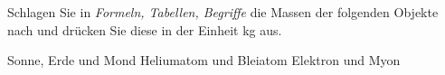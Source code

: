 Schlagen Sie in \emph{Formeln, Tabellen, Begriffe} die Massen der folgenden Objekte nach und drücken Sie diese in der Einheit kg aus.

\begin{abcliste}
\abc Sonne, Erde und Mond
\abc Heliumatom und Bleiatom
\abc Elektron und Myon
\end{abcliste}
